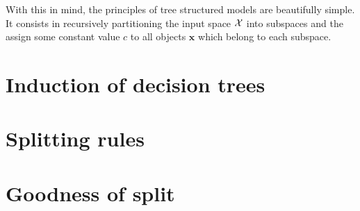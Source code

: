 With this in mind, the principles of tree structured models are beautifully
simple. It consists in recursively partitioning the input space ${\cal X}$
into subspaces and the assign some constant value $c$ to all objects $\mathbf{x}$
which belong to each subspace.




\section{Induction of decision trees}
\label{sec:3:induction}


\section{Splitting rules}
\label{sec:3:splitting-rules}


\section{Goodness of split}
\label{sec:3:criteria}


